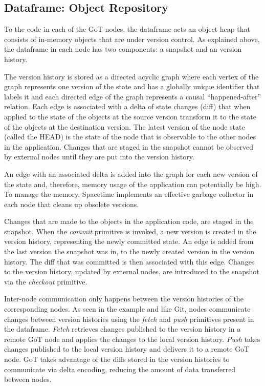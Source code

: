 \subsection{Dataframe: Object Repository}
To the code in each of the GoT nodes, the dataframe acts an object heap that consists of in-memory objects that are under version control. As explained above, the dataframe in each node has two components: a snapshot and an version history.

The version history is stored as a directed acyclic graph where each vertex of the graph represents one version of the state and has a globally unique identifier that labels it and each directed edge of the graph represents a causal ``happened-after'' relation. Each edge is associated with a delta of state changes (diff) that when applied to the state of the objects at the source version transform it to the state of the objects at the destination version. The latest version of the node state (called the HEAD) is the state of the node that is observable to the other nodes in the application. Changes that are staged in the snapshot cannot be observed by external nodes until they are put into the version history. 

An edge with an associated delta is added into the graph for each new version of the state and, therefore, memory usage of the application can potentially be high. To manage the memory, Spacetime implements an effective garbage collector in each node that cleans up obsolete versions.

Changes that are made to the objects in the application code, are staged in the snapshot. When the {\em commit} primitive is invoked, a new version is created in the version history, representing the newly committed state. An edge is added from the last version the snapshot was in, to the newly created version in the version history. The diff that was committed is then associated with this edge. Changes to the version history, updated by external nodes, are introduced to the snapshot via the {\em checkout} primitive.

Inter-node communication only happens between the version histories of the corresponding nodes. As seen in the example and like Git, nodes communicate changes between version histories using the {\em fetch} and {\em push} primitives present in the dataframe. {\em Fetch} retrieves changes published to the version history in a remote GoT node and applies the changes to the local version history. {\em Push} takes changes published to the local version history and delivers it to a remote GoT node. GoT takes advantage of the diffs stored in the version histories to communicate via delta encoding, reducing the amount of data transferred between nodes. 

